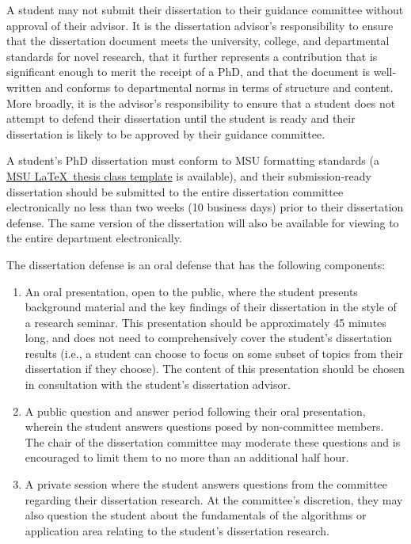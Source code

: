 A student may not submit their dissertation to their guidance
committee without approval of their advisor.  It is the dissertation
advisor's responsibility to ensure that the dissertation document
meets the university, college, and departmental standards for novel
research, that it further represents a contribution that is
significant enough to merit the receipt of a PhD, and that the
document is well-written and  conforms to departmental norms in
terms of structure and content.  More broadly, it is the advisor's
responsibility to ensure that a student does not attempt to defend
their dissertation until the student is ready and  their dissertation
is likely to be approved by their guidance committee.

A student's PhD dissertation must conform to MSU formatting standards
(a \href{http://ctan.org/pkg/msu-thesis}{MSU \LaTeX\ thesis class
  template} is available), and their submission-ready dissertation should be submitted to the entire
dissertation committee electronically no less than two weeks (10 business days) prior to
their dissertation defense.  The same version of the dissertation will also be available for
viewing to the entire department electronically.

The dissertation defense is an oral defense that has the following
components:

\begin{enumerate}

\item An oral presentation, open to the public, where the student
  presents background material and the key findings of their
  dissertation in the style of a research seminar.  This presentation
  should be approximately 45 minutes long, and does not need to
  comprehensively cover the student's dissertation results (i.e., a
  student can choose to focus on some subset of topics from their
  dissertation if they choose).  The content of this presentation
  should be chosen in consultation with the student's dissertation advisor.

\item A public question and answer period following their oral
  presentation, wherein the student answers questions posed by
  non-committee members.  The chair of the dissertation committee may
  moderate these questions and is encouraged to limit them to no more
  than an additional half hour.

\item A private session where the student answers questions from the
  committee regarding their dissertation research.  At the committee's
  discretion, they may also question the student about the
  fundamentals of the algorithms or application area relating to the
  student's dissertation research.

\end{enumerate}

